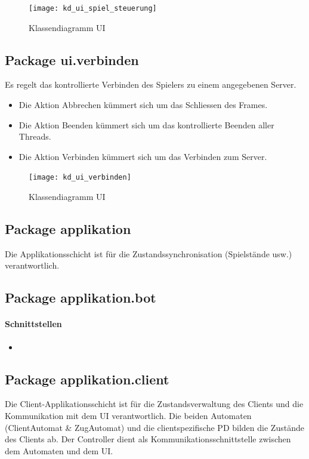 \documentclass[12pt,halfparskip]{scrartcl}
\begin{document}
\begin{figure}[h]
	\centering
	\texttt{[image: kd\_ui\_spiel\_steuerung]}
	\caption{Klassendiagramm UI}
	\label{fig:kd_ui_spiel_steuerung}
\end{figure}

\subsection{Package ui.verbinden}
Es regelt das kontrollierte Verbinden des Spielers zu einem angegebenen Server.

\begin{itemize}
	\item Die Aktion Abbrechen kümmert sich um das Schliessen des Frames.
	\item Die Aktion Beenden kümmert sich um das kontrollierte Beenden aller Threads.
	\item Die Aktion Verbinden kümmert sich um das Verbinden zum Server.
\end{itemize}

\begin{figure}[h]
	\centering
	\texttt{[image: kd\_ui\_verbinden]}
	\caption{Klassendiagramm UI}
	\label{fig:kd_ui_verbinden}
\end{figure}

\clearpage
\subsection{Package applikation}

Die Applikationsschicht ist für die Zustandssynchronisation (Spielstände usw.) verantwortlich.

\subsection{Package applikation.bot}

	\paragraph{Schnittstellen}
	\begin{itemize}
		\item 
	\end{itemize}
	
\subsection{Package applikation.client}

	Die Client-Applikationsschicht ist für die Zustandsverwaltung des Clients und die Kommunikation mit dem UI verantwortlich. Die beiden Automaten (ClientAutomat \& ZugAutomat) und die clientspezifische PD bilden die Zustände des Clients ab. Der Controller dient als Kommunikationsschnittstelle zwischen dem Automaten und dem UI.
	
\end{document}
